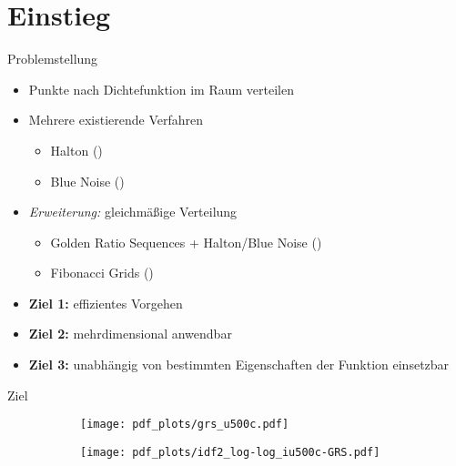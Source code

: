 \section{Einstieg}

\begin{frame}{Problemstellung}
	\begin{itemize}
		\item Punkte nach Dichtefunktion im Raum verteilen
		\item<2-> Mehrere existierende Verfahren
		\begin{itemize}
			\item Halton (\cite{wong_luk_heng-halton_points_sampling-1997})
			\item Blue Noise (\cite{yan-blue_noise_sampling-2015})
		\end{itemize}
		\item<3-> \textit{Erweiterung:} gleichmäßige Verteilung
		\begin{itemize}
			\item Golden Ratio Sequences + Halton/Blue Noise (\cite{schretter-golden_ratio_sequences-2012})
			\item Fibonacci Grids (\cite{frisch_hanebeck-deterministic_gaussian_sampling-2021})
		\end{itemize}
		\item<4->\textbf{Ziel 1:} effizientes Vorgehen 
		\item<5->\textbf{Ziel 2:} mehrdimensional anwendbar
		\item<6->\textbf{Ziel 3:} unabhängig von bestimmten Eigenschaften der Funktion einsetzbar
	\end{itemize}
\end{frame}

\begin{frame}{Ziel}
	\begin{figure}
		\begin{subfigure}{.45\textwidth}
			\centering
			\texttt{[image: pdf\_plots/grs\_u500c.pdf]}
		\end{subfigure}
		\begin{subfigure}{.45\textwidth}
			\centering
			\texttt{[image: pdf\_plots/idf2\_log-log\_iu500c-GRS.pdf]}
		\end{subfigure}
		\caption{\cite{schretter-golden_ratio_sequences-2012}}
	\end{figure}
\end{frame}